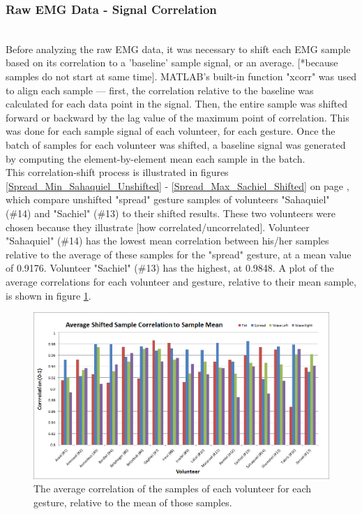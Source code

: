 \documentclass[journal]{IEEEtran}
\begin{document}
\pagebreak[4]
\newpage



\subsubsection{Raw EMG Data - Signal Correlation} \\
Before analyzing the raw EMG data, it was necessary to shift each EMG sample based on its correlation to a 'baseline' sample signal, or an average. [*because samples do not start at same time]. MATLAB's built-in function "xcorr" was used to align each sample --- first, the correlation relative to the baseline was calculated for each data point in the signal. Then, the entire sample was shifted forward or backward by the lag value of the maximum point of correlation. This was done for each sample signal of each volunteer, for each gesture. Once the batch of samples for each volunteer was shifted, a baseline signal was generated by computing the element-by-element mean each sample in the batch. \\
This correlation-shift process is illustrated in figures \ref{Spread_Min_Sahaquiel_Unshifted} - \ref{Spread_Max_Sachiel_Shifted} on page \pageref{Spread_Min_Sahaquiel_Unshifted}, which compare unshifted "spread" gesture samples of volunteers "Sahaquiel" (\#14) and "Sachiel" (\#13)  to their shifted results. These two volunteers were chosen because they illustrate [how correlated/uncorrelated]. Volunteer "Sahaquiel" (\#14) has the lowest mean correlation between his/her samples relative to the average of these samples for the "spread" gesture, at a mean value of 0.9176. Volunteer "Sachiel" (\#13) has the highest, at 0.9848. A plot of the average correlations for each volunteer and gesture, relative to their mean sample, is shown in figure \ref{Average_Corr_Bar}.

    \begin{figure}[H]
    \centering
    \includegraphics[width=1\columnwidth]{EMG/Average_Corr_Bar}
    \caption{The average correlation of the samples of each volunteer for each gesture, relative to the mean of those samples.}
    \label{Average_Corr_Bar}
    \end{figure}
    
\end{document}
